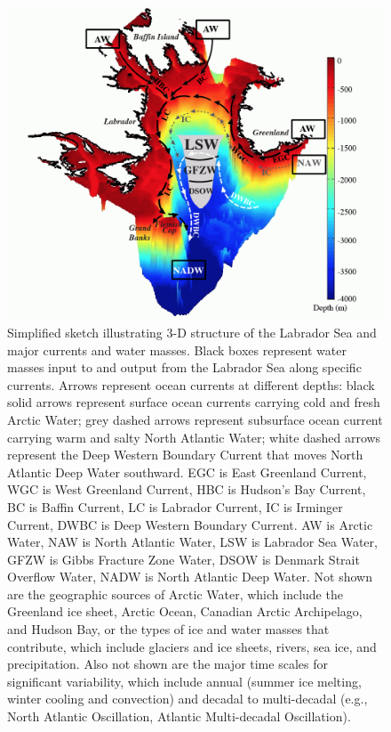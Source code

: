 \clearpage
\begin{figure}
\centering
\includegraphics{figs_app/FigS1.png}
\caption[Simplified sketch illustrating 3-D structure of the Labrador Sea and major currents and water masses.]{Simplified sketch illustrating 3-D structure of the Labrador Sea and major currents and water masses. Black boxes represent water masses input to and output from the Labrador Sea along specific currents.  Arrows represent ocean currents at different depths: black solid arrows represent surface ocean currents carrying cold and fresh Arctic Water; grey dashed arrows represent subsurface ocean current carrying warm and salty North Atlantic Water; white dashed arrows represent the Deep Western Boundary Current that moves North Atlantic Deep Water southward.  EGC is East Greenland Current, WGC is West Greenland Current, HBC is Hudson's Bay Current, BC is Baffin Current, LC is Labrador Current, IC is Irminger Current, DWBC is Deep Western Boundary Current. AW is Arctic Water, NAW is North Atlantic Water, LSW is Labrador Sea Water, GFZW is Gibbs Fracture Zone Water, DSOW is Denmark Strait Overflow Water, NADW is North Atlantic Deep Water.  Not shown are the geographic sources of Arctic Water, which include the Greenland ice sheet, Arctic Ocean, Canadian Arctic Archipelago, and Hudson Bay, or the types of ice and water masses that contribute, which include glaciers and ice sheets, rivers, sea ice, and precipitation.  Also not shown are the major time scales for significant variability, which include annual (summer ice melting, winter cooling and convection) and decadal to multi-decadal (e.g., North Atlantic Oscillation, Atlantic Multi-decadal Oscillation).}
\label{fig:SI4_fig1}
\end{figure}

